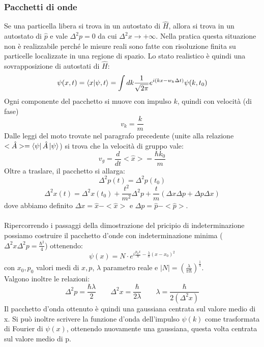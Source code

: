 \documentclass{article}
\begin{document}
\subsubsection{Pacchetti di onde}
Se una particella libera si trova in un autostato di $\hat{H}$, allora si trova in un autostato di $\hat{p}$ e vale $\Delta^2p=0$ da cui $\Delta^2x\rightarrow+\infty$. Nella pratica questa situazione non è realizzabile perché le misure reali sono fatte con risoluzione finita su particelle localizzate in una regione di spazio. Lo stato realistico è quindi una sovrapposizione di autostati di $\hat{H}$:
$$ \psi(x,t)=\bra{x}\ket{\psi, t}=\int dk \frac{1}{\sqrt{2\pi}}e^{i(kx-w_k\Delta t)}\psi(k,t_0) $$
Ogni componente del pacchetto si muove con impulso $k$, quindi con velocità (di fase)
$$ v_k=\frac{k}{m} $$
Dalle leggi del moto trovate nel paragrafo precedente (unite alla relazione $<\hat{A}>=\bra{\psi}\hat{A}\ket{\psi}$) si trova che la velocità di gruppo vale:
$$ v_g=\frac{d}{dt}<\hat{x}>=\frac{\hbar k_0}{m} $$
Oltre a traslare, il pacchetto si allarga:
$$ \Delta^2p(t)=\Delta^2p(t_0) $$ 
$$\Delta^2x(t)=\Delta^2x(t_0)+\frac{t^2}{m^2}\Delta^2p+\frac{t}{m}(\Delta x\Delta p+\Delta p\Delta x)$$
dove abbiamo definito $\Delta x=\hat{x}-<\hat{x}>$ e $\Delta p=\hat{p}-<\hat{p}>$.
\\\\
Ripercorrendo i passaggi della dimostrazione del pricipio di indeterminazione possiamo costruire il pacchetto d'onde con indeterminazione minima ($\Delta^2x\Delta^2p=\frac{\hbar^2}{4}$) ottenendo:
$$ \psi(x)=N\cdot e^{i\frac{p_0x}{\hbar}-\frac{\lambda}{\hbar}(x-x_0)^2} $$
con $x_0,p_0$ valori medi di $x,p$, $\lambda$ parametro reale e $|N|=\left( \frac{\lambda}{\pi\hbar} \right)^{\frac{1}{4}}$.\\
Valgono inoltre le relazioni:
$$ \Delta^2p=\frac{\hbar\lambda}{2} \qquad \Delta^2x=\frac{\hbar}{2\lambda} \qquad \lambda=\frac{\hbar}{2(\Delta^2x)} $$
Il pacchetto d'onda ottenuto è quindi una gaussiana centrata sul valore medio di x. Si può inoltre scrivere la funzione d'onda dell'impulso $\psi(k)$ come trasformata di Fourier di $\psi(x)$, ottenendo nuovamente una gaussiana, questa volta centrata sul valore medio di p.
\end{document}
